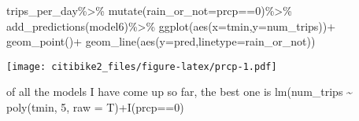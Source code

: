 \documentclass[
]{article}
\newenvironment{Shaded}{\begin{snugshade}}{\end{snugshade}}
\newcommand{\AttributeTok}[1]{\textcolor[rgb]{0.77,0.63,0.00}{#1}}
\newcommand{\DecValTok}[1]{\textcolor[rgb]{0.00,0.00,0.81}{#1}}
\newcommand{\FunctionTok}[1]{\textcolor[rgb]{0.00,0.00,0.00}{#1}}
\newcommand{\NormalTok}[1]{#1}
\newcommand{\SpecialCharTok}[1]{\textcolor[rgb]{0.00,0.00,0.00}{#1}}
\begin{document}
\begin{Shaded}
\begin{Highlighting}[]
\NormalTok{trips\_per\_day}\SpecialCharTok{\%\textgreater{}\%}
  \FunctionTok{mutate}\NormalTok{(}\AttributeTok{rain\_or\_not=}\NormalTok{prcp}\SpecialCharTok{==}\DecValTok{0}\NormalTok{)}\SpecialCharTok{\%\textgreater{}\%}
  \FunctionTok{add\_predictions}\NormalTok{(model6)}\SpecialCharTok{\%\textgreater{}\%}
  \FunctionTok{ggplot}\NormalTok{(}\FunctionTok{aes}\NormalTok{(}\AttributeTok{x=}\NormalTok{tmin,}\AttributeTok{y=}\NormalTok{num\_trips))}\SpecialCharTok{+}
  \FunctionTok{geom\_point}\NormalTok{()}\SpecialCharTok{+}
  \FunctionTok{geom\_line}\NormalTok{(}\FunctionTok{aes}\NormalTok{(}\AttributeTok{y=}\NormalTok{pred,}\AttributeTok{linetype=}\NormalTok{rain\_or\_not))}
\end{Highlighting}
\end{Shaded}

\texttt{[image: citibike2\_files/figure-latex/prcp-1.pdf]}

of all the models I have come up so far, the best one is lm(num\_trips
\textasciitilde{} poly(tmin, 5, raw = T)+I(prcp==0)
\end{document}
